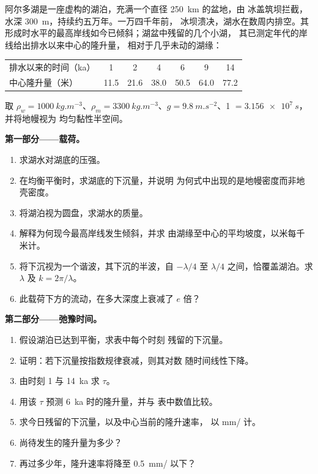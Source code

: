 \begin{problem}
\label{pb:b3:mantle-convection:1}
阿尔多湖是一座虚构的湖泊，充满一个直径 \qty{250}{km} 的盆地，由
冰盖筑坝拦截，水深 \qty{300}{m}，持续约五万年。一万四千年前，
冰坝溃决，湖水在数周内排空。其
形成时水平的最高岸线如今已倾斜；湖盆中残留的几个小湖，
其已测定年代的岸线给出排水以来中心的隆升量，
相对于几乎未动的湖缘：

\smallskip
\begin{center}\small
\begin{tabular}{lcccccc}
\hline
排水以来的时间（ka） & 1 & 2 & 4 & 6 & 9 & 14\\
中心隆升量（米） & 11.5 & 21.6 & 38.0 & 50.5 & 64.0 & 77.2\\
\hline
\end{tabular}
\end{center}
\smallskip

取 $\rho_w = \qty{1000}{kg.m^{-3}}$、$\rho_m = \qty{3300}{kg.m^{-3}}$、$g =
\qty{9.8}{m.s^{-2}}$、\qty{1}{} $= \qty{3.156e7}{s}$，并将地幔视为
均匀黏性半空间。

\medskip\noindent\textbf{第一部分——载荷。}
\begin{enumerate}
  \item 求湖水对湖底的压强。
  \item 在均衡平衡时，求湖底的下沉量，并说明
        为何式中出现的是地幔密度而非地壳密度。
  \item 将湖泊视为圆盘，求湖水的质量。
  \item 解释为何现今最高岸线发生倾斜，并求
        由湖缘至中心的平均坡度，以米每千米计。
  \item 将下沉视为一个谐波，其下沉的半波，自
        $-\lambda/4$ 至 $\lambda/4$ 之间，恰覆盖湖泊。求 $\lambda$ 及 $k =
        2\pi/\lambda$。
  \item 此载荷下方的流动，在多大深度上衰减了
        $e$ 倍？
\end{enumerate}

\medskip\noindent\textbf{第二部分——弛豫时间。}
\begin{enumerate}[resume]
  \item 假设湖泊已达到平衡，求表中每个时刻
        残留的下沉量。
  \item 证明：若下沉量按指数规律衰减，则其对数
        随时间线性下降。
  \item 由时刻 1 与 \qty{14}{ka} 求 $\tau$。
  \item 用该 $\tau$ 预测 \qty{6}{ka} 时的隆升量，并与
        表中数值比较。
  \item 求今日残留的下沉量，以及中心当前的隆升速率，
        以 \unit{mm/} 计。
  \item 尚待发生的隆升量为多少？
  \item 再过多少年，隆升速率将降至
        \qty{0.5}{mm/} 以下？
\end{enumerate}


\end{problem}
